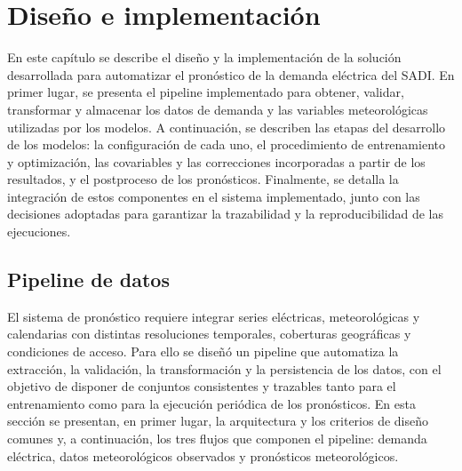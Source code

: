 \chapter{Diseño e implementación} %

\label{Chapter3} %

En este capítulo se describe el diseño y la implementación de la solución desarrollada para automatizar el pronóstico de la demanda eléctrica del SADI. En primer lugar, se presenta el pipeline implementado para obtener, validar, transformar y almacenar los datos de demanda y las variables meteorológicas utilizadas por los modelos. A continuación, se describen las etapas del desarrollo de los modelos: la configuración de cada uno, el procedimiento de entrenamiento y optimización, las covariables y las correcciones incorporadas a partir de los resultados, y el postproceso de los pronósticos. Finalmente, se detalla la integración de estos componentes en el sistema implementado, junto con las decisiones adoptadas para garantizar la trazabilidad y la reproducibilidad de las ejecuciones.

\section{Pipeline de datos}
\label{sec:pipeline_datos}

El sistema de pronóstico requiere integrar series eléctricas, meteorológicas y calendarias con distintas resoluciones temporales, coberturas geográficas y condiciones de acceso. Para ello se diseñó un pipeline que automatiza la extracción, la validación, la transformación y la persistencia de los datos, con el objetivo de disponer de conjuntos consistentes y trazables tanto para el entrenamiento como para la ejecución periódica de los pronósticos. En esta sección se presentan, en primer lugar, la arquitectura y los criterios de diseño comunes y, a continuación, los tres flujos que componen el pipeline: demanda eléctrica, datos meteorológicos observados y pronósticos meteorológicos.

